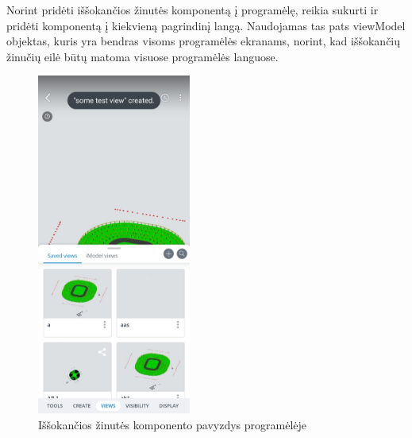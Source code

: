  Norint pridėti iššokančios žinutės komponentą į 
programėlę, reikia sukurti ir pridėti komponentą į kiekvieną pagrindinį langą. Naudojamas tas pats viewModel objektas, kuris yra bendras visoms programėlės ekranams, norint, kad
iššokančių žinučių eilė būtų matoma visuose programėlės languose. 
\begin{figure}[htbp!]
    \centering
    \includegraphics[width=0.45\textwidth]{Images/toastView.jpeg}
    \caption{Iššokančios žinutės komponento pavyzdys programėlėje}
    \label{fig:modelToastView}
\end{figure}